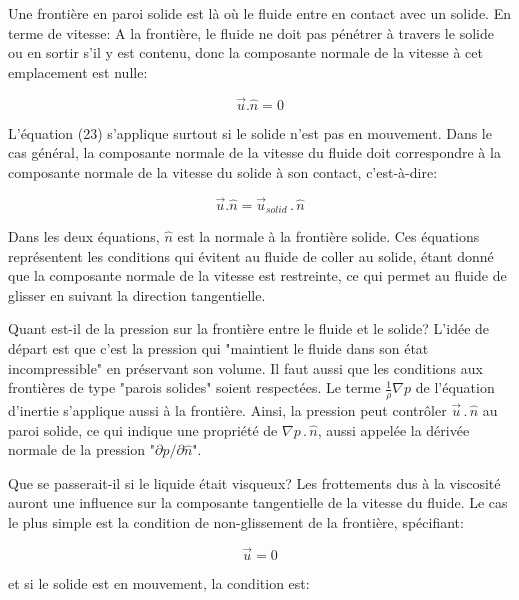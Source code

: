 \documentclass[11pt]{report}
\begin{document}
Une frontière en paroi solide est là où le fluide entre en contact avec un solide. En terme de vitesse: A la frontière, le fluide ne doit pas pénétrer à travers le solide ou en sortir s'il y est contenu, donc la composante normale de la vitesse à cet emplacement est nulle:

\begin{equation}
\overrightarrow{u}.\hat{n} = 0
\end{equation}

L'équation (23) s'applique surtout si le solide n'est pas en mouvement. Dans le cas général, la composante normale de la vitesse du fluide doit correspondre à la composante normale de la vitesse du solide à son contact, c'est-à-dire:

\begin{equation}
\overrightarrow{u}.\hat{n} = \overrightarrow{u}\!\!_{solid} \,.\, \hat{n}
\end{equation}

Dans les deux équations, $ \hat{n} $ est la normale à la frontière solide.
Ces équations représentent les conditions qui évitent au fluide de coller au solide, étant donné que la composante normale de la vitesse est restreinte, ce qui permet au fluide de glisser en suivant la direction tangentielle.\newline

Quant est-il de la pression sur la frontière entre le fluide et le solide? L'idée de départ est que c'est la pression qui "maintient le fluide dans son état incompressible" en préservant son volume. Il faut aussi que les conditions aux frontières de type "parois solides" soient respectées. Le terme $ \frac{1}{\rho}\nabla p$ de l'équation d'inertie s'applique aussi à la frontière. Ainsi, la pression peut contrôler $  \overrightarrow{u} \,.\, \hat{n} $ au paroi solide, ce qui indique une propriété de $ \nabla p \,.\, \hat{n} $, aussi appelée la dérivée normale de la pression "$ \partial p / \partial \hat{n} $".\newline

Que se passerait-il si le liquide était visqueux? Les frottements dus à la viscosité auront une influence sur la composante tangentielle de la vitesse du fluide. Le cas le plus simple est la condition de non-glissement de la frontière, spécifiant:

\begin{equation}
\overrightarrow{u} = 0
\end{equation}

et si le solide est en mouvement, la condition est:
\end{document}
